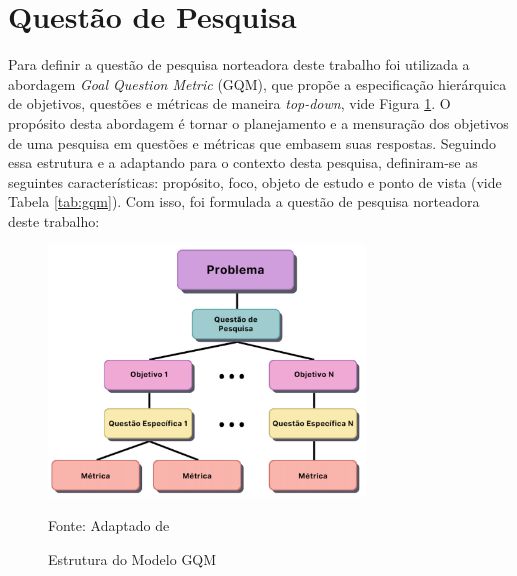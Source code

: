 \section{Questão de Pesquisa} 
\label{sec:questao}

Para definir a questão de pesquisa norteadora deste trabalho foi utilizada a abordagem \textit{Goal Question Metric} (GQM), que propõe a especificação hierárquica de objetivos, questões e métricas de maneira \textit{top-down}, vide Figura \ref{fig:GOAL_QUESTION_METRIC}. O propósito desta abordagem é tornar o planejamento e a mensuração dos objetivos de uma pesquisa em questões e métricas que embasem suas respostas. Seguindo essa estrutura e a adaptando para o contexto desta pesquisa, definiram-se as seguintes características: propósito, foco, objeto de estudo e ponto de vista (vide Tabela \ref{tab:gqm}). Com isso, foi formulada a questão de pesquisa norteadora deste trabalho:

\begin{figure}[h] 
    \centering
    \caption{Estrutura do Modelo GQM}
    \includegraphics[width=0.75\textwidth]{figuras/gqm.png}

    \begin{center}
    \text Fonte: Adaptado de  
    
    \end{center}
    \label{fig:GOAL_QUESTION_METRIC}
\end{figure}


